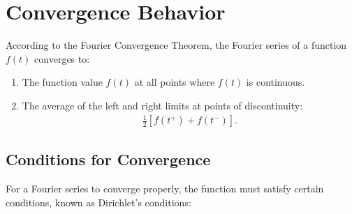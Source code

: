 \documentclass[12pt,a4paper]{report}
\begin{document}
\newpage


\section{Convergence Behavior}

According to the Fourier Convergence Theorem, the Fourier series of a function $ f(t) $ converges to:
\begin{enumerate}
    \item The function value $ f(t) $ at all points where $ f(t) $ is continuous.
    \item The average of the left and right limits at points of discontinuity:
    \begin{align}
    \frac{1}{2} \left[ f(t^+) + f(t^-) \right].
    \end{align}
\end{enumerate}

\subsection{Conditions for Convergence}

For a Fourier series to converge properly, the function must satisfy certain conditions, known as Dirichlet's conditions:
\end{document}
